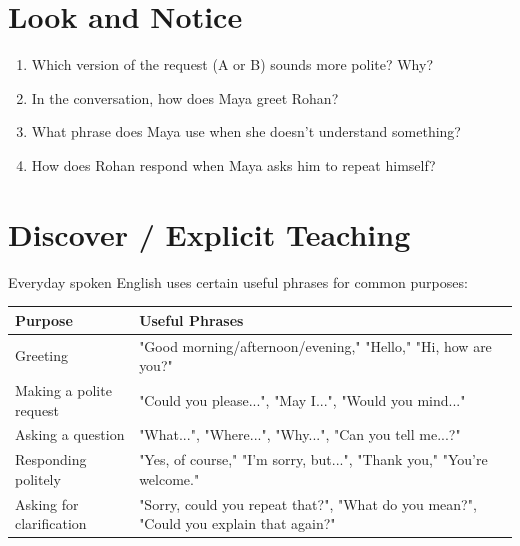 \section{Look and Notice}
\begin{thinkbox}
\begin{enumerate}
    \item Which version of the request (A or B) sounds more polite? Why?
    \item In the conversation, how does Maya greet Rohan?
    \item What phrase does Maya use when she doesn't understand something?
    \item How does Rohan respond when Maya asks him to repeat himself?
\end{enumerate}
\end{thinkbox}

\section{Discover / Explicit Teaching}
Everyday spoken English uses certain useful phrases for common purposes:

\begin{table}[h!]
\centering
\begin{tabular}{|l|l|}
\hline
\textbf{Purpose} & \textbf{Useful Phrases} \\
\hline
Greeting & "Good morning/afternoon/evening," "Hello," "Hi, how are you?" \\
Making a polite request & "Could you please...", "May I...", "Would you mind..." \\
Asking a question & "What...", "Where...", "Why...", "Can you tell me...?" \\
Responding politely & "Yes, of course," "I'm sorry, but...", "Thank you," "You're welcome." \\
Asking for clarification & "Sorry, could you repeat that?", "What do you mean?", "Could you explain that again?" \\
\hline
\end{tabular}
\end{table}

